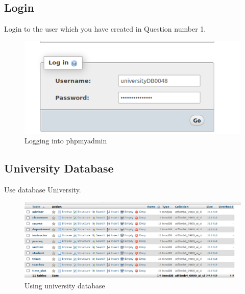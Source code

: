 \documentclass{article}
\begin{document}
\subsection{Login}
Login to the user which you have created in Question number 1.
\begin{figure}[!ht]
  \begin{center}
  \includegraphics[scale=1]{Q7_1.png}
  \caption{Logging into phpmyadmin}
  \end{center}
\end{figure}

\newpage
\subsection{University Database}
Use database University.
\begin{figure}[!ht]
  \begin{center}
  \includegraphics[scale=0.7]{Q7_2.png}
  \caption{Using university database}
  \end{center}
\end{figure}

\newpage
\end{document}
